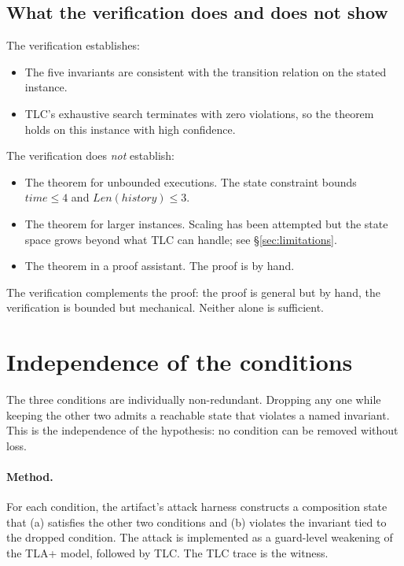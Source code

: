 \documentclass[11pt,a4paper]{article}
\theoremstyle{plain}
\theoremstyle{definition}
\theoremstyle{remark}
\begin{document}
\subsection{What the verification does and does not show}

The verification establishes:
\begin{itemize}
  \item The five invariants are consistent with the transition relation on the
  stated instance.
  \item TLC's exhaustive search terminates with zero violations, so the
  theorem holds on this instance with high confidence.
\end{itemize}

The verification does \emph{not} establish:
\begin{itemize}
  \item The theorem for unbounded executions. The state constraint bounds
  $\mathit{time} \le 4$ and $\mathit{Len}(\mathit{history}) \le 3$.
  \item The theorem for larger instances. Scaling has been attempted but the
  state space grows beyond what TLC can handle; see
  \S\ref{sec:limitations}.
  \item The theorem in a proof assistant. The proof is by hand.
\end{itemize}

The verification complements the proof: the proof is general but by hand, the
verification is bounded but mechanical. Neither alone is sufficient.

\section{Independence of the conditions}
\label{sec:independence}

The three conditions are individually non-redundant. Dropping any one while
keeping the other two admits a reachable state that violates a named
invariant. This is the independence of the hypothesis: no condition can be
removed without loss.

\paragraph{Method.} For each condition, the artifact's attack harness
constructs a composition state that (a) satisfies the other two conditions and
(b) violates the invariant tied to the dropped condition. The attack is
implemented as a guard-level weakening of the TLA+ model, followed by TLC.
The TLC trace is the witness.
\end{document}
